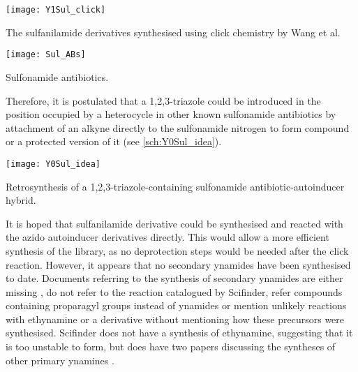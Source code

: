 \begin{scheme}[H]
	\begin{center}
		\texttt{[image: Y1Sul\_click]}
		\caption{The sulfanilamide derivatives synthesised using click chemistry by Wang et al\cite{Wang2010}.
		\label{sch:Y1Sul_click}}
	\end{center}
\end{scheme}

\begin{scheme}[H]
	\begin{center}
		\texttt{[image: Sul\_ABs]}
		\caption{Sulfonamide antibiotics.
		\label{fig:Sul_ABs}}
	\end{center}
\end{scheme}

Therefore, it is postulated that a 1,2,3-triazole could be introduced in the position occupied by a heterocycle in other known sulfonamide antibiotics by attachment of an alkyne directly to the sulfonamide nitrogen to form compound  or a protected version of it (see \ref{sch:Y0Sul_idea}).

\begin{scheme}[H]
	\begin{center}
		\texttt{[image: Y0Sul\_idea]}
		\caption{Retrosynthesis of a 1,2,3-triazole-containing sulfonamide antibiotic-autoinducer hybrid.
		\label{sch:Y0Sul_idea}}
	\end{center}
\end{scheme}



It is hoped that sulfanilamide derivative  could be synthesised and reacted with the azido autoinducer derivatives directly. This would allow a more efficient synthesis of the library, as no deprotection steps would be needed after the click reaction. However, it appears that no secondary ynamides have been synthesised to date\cite{ScifinderSecondaryYnamide}.
Documents referring to the synthesis of secondary ynamides are either missing \cite{Vellanki2013}, do not refer to the reaction catalogued by Scifinder\cite{Yamaguchi2013,Kaiser2010,Zavyalov1967}, refer compounds containing proparagyl groups instead of ynamides\cite{Gnaccarini2012,Wang2012,Rajopadhye2007,LeitDeMoradeiMarcela2006} or mention unlikely reactions with ethynamine\cite{Edmondson2013} or a derivative\cite{Fujimaki1999} without mentioning how these precursors were synthesised. Scifinder does not have a synthesis of ethynamine, suggesting that it is too unstable to form, but does have two papers discussing the syntheses of other primary ynamines \cite{Shvartsberg1976,Hill1998}.

